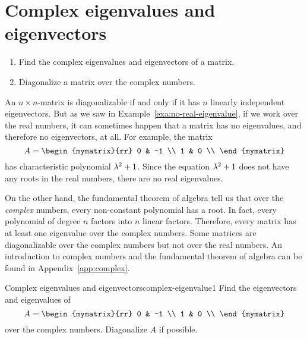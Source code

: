 \section{Complex eigenvalues and eigenvectors}

\begin{outcome}
  \begin{enumerate}
  \item Find the complex eigenvalues and eigenvectors of a matrix.
  \item Diagonalize a matrix over the complex numbers.
  \end{enumerate}
\end{outcome}

An $n\times n$-matrix is diagonalizable if and only if it has $n$
linearly independent eigenvectors. But as we saw in
Example~\ref{exa:no-real-eigenvalue}, if we work over the real
numbers, it can sometimes happen that a matrix has no eigenvalues, and
therefore no eigenvectors, at all. For example, the matrix
\begin{equation*}
  A=\begin{mymatrix}{rr}
      0 & -1 \\
      1 &  0 \\
    \end{mymatrix}
\end{equation*}
has characteristic polynomial $\lambda^2+1$. Since the equation
$\lambda^2+1$ does not have any roots in the real numbers, there are
no real eigenvalues.

On the other hand, the fundamental theorem of algebra tell us that
over the {\em complex} numbers, every non-constant polynomial has a
root. In fact, every polynomial of degree $n$ factors into $n$ linear
factors. Therefore, every matrix has at least one eigenvalue over the
complex numbers. Some matrices are diagonalizable over the complex
numbers but not over the real numbers. An introduction to complex
numbers and the fundamental theorem of algebra can be found in
Appendix~\ref{app:complex}.

\begin{example}{Complex eigenvalues and eigenvectors}{complex-eigenvalue1}
  Find the eigenvectors and eigenvalues of
  \begin{equation*}
    A=\begin{mymatrix}{rr}
      0 & -1 \\
      1 &  0 \\
    \end{mymatrix}
  \end{equation*}
  over the complex numbers. Diagonalize $A$ if possible.
\end{example}

